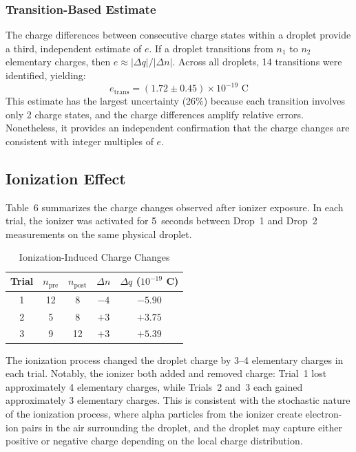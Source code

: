 \documentclass[11pt]{article}
\begin{document}
\subsubsection{Transition-Based Estimate}

The charge differences between consecutive charge states within a droplet provide a third, independent estimate of $e$. If a droplet transitions from $n_1$ to $n_2$ elementary charges, then $e \approx |\Delta q| / |\Delta n|$. Across all droplets, 14 transitions were identified, yielding:
\begin{equation}
e_{\text{trans}} = (1.72 \pm 0.45) \times 10^{-19} \text{ C}
\end{equation}
This estimate has the largest uncertainty (26\%) because each transition involves only 2 charge states, and the charge differences amplify relative errors. Nonetheless, it provides an independent confirmation that the charge changes are consistent with integer multiples of $e$.

\subsection{Ionization Effect}

Table~6 summarizes the charge changes observed after ionizer exposure. In each trial, the ionizer was activated for 5~seconds between Drop~1 and Drop~2 measurements on the same physical droplet.

\begin{table}[h!]
    \centering
    \caption{Ionization-Induced Charge Changes}
    \vspace{0.1in}
    \begin{tabular}{|c|c|c|c|c|}
    \hline
    \textbf{Trial} & \textbf{$n_{\text{pre}}$} & \textbf{$n_{\text{post}}$} & \textbf{$\Delta n$} & \textbf{$\Delta q$ ($10^{-19}$ C)} \\
    \hline
    1 & 12 & 8  & $-4$ & $-5.90$ \\
    2 & 5  & 8  & $+3$ & $+3.75$ \\
    3 & 9  & 12 & $+3$ & $+5.39$ \\
    \hline
    \end{tabular}
\end{table}

The ionization process changed the droplet charge by 3--4 elementary charges in each trial. Notably, the ionizer both added and removed charge: Trial~1 lost approximately 4 elementary charges, while Trials~2 and~3 each gained approximately 3 elementary charges. This is consistent with the stochastic nature of the ionization process, where alpha particles from the ionizer create electron-ion pairs in the air surrounding the droplet, and the droplet may capture either positive or negative charge depending on the local charge distribution.
\end{document}
